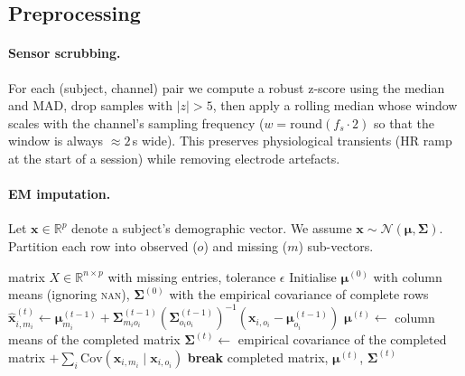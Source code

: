 \documentclass[sigconf,nonacm]{acmart}
\begin{document}
\subsection{Preprocessing}
\paragraph{Sensor scrubbing.}
For each (subject, channel) pair we compute a robust z-score using
the median and MAD, drop samples with $|z|>5$, then apply a rolling
median whose window scales with the channel's sampling frequency
($w\!=\!\mathrm{round}(f_{s}\cdot 2)$ so that the window is always
$\approx\! 2$\,s wide). This preserves physiological transients
(HR ramp at the start of a session) while removing electrode
artefacts.

\paragraph{EM imputation.}
Let $\mathbf{x}\!\in\!\mathbb{R}^{p}$ denote a subject's demographic
vector. We assume
$\mathbf{x}\sim\mathcal{N}(\boldsymbol{\mu},\boldsymbol{\Sigma})$.
Partition each row into observed ($o$) and missing ($m$) sub-vectors.

\begin{algorithm}[t]
\caption{Multivariate-Gaussian EM imputation}
\label{alg:em}
\begin{algorithmic}[1]
\Require matrix $X\in\mathbb{R}^{n\times p}$ with missing entries,
         tolerance $\epsilon$
\State Initialise $\boldsymbol{\mu}^{(0)}$ with column means (ignoring
       \textsc{nan}), $\boldsymbol{\Sigma}^{(0)}$ with the empirical
       covariance of complete rows
    \State $\hat{\mathbf{x}}^{(t)}_{i,m_{i}} \gets
      \boldsymbol{\mu}^{(t-1)}_{m_{i}} +
      \boldsymbol{\Sigma}^{(t-1)}_{m_{i}o_{i}}
      (\boldsymbol{\Sigma}^{(t-1)}_{o_{i}o_{i}})^{-1}
      (\mathbf{x}_{i,o_{i}}-\boldsymbol{\mu}^{(t-1)}_{o_{i}})$
  \EndFor
  \State $\boldsymbol{\mu}^{(t)} \gets$ column means of the completed
         matrix
  \State $\boldsymbol{\Sigma}^{(t)} \gets$ empirical covariance of the
         completed matrix $+ \sum_{i}\mathrm{Cov}(\mathbf{x}_{i,m_{i}}\mid
         \mathbf{x}_{i,o_{i}})$
     \State \textbf{break}
  \EndIf
\EndFor
\State \Return completed matrix, $\boldsymbol{\mu}^{(t)}$,
       $\boldsymbol{\Sigma}^{(t)}$
\end{algorithmic}
\end{algorithm}
\end{document}
